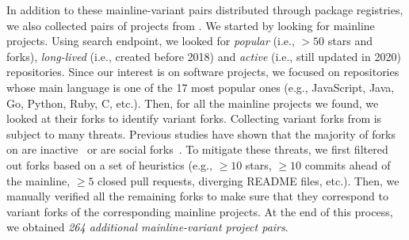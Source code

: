 In addition to these mainline-variant pairs distributed through package registries, we also collected pairs of projects from \gh.
We started by looking for mainline projects.
Using \gh search endpoint, we looked for \emph{popular} (i.e., $>50$ stars and forks), \emph{long-lived} (i.e., created before 2018) and \emph{active} (i.e., still updated in 2020) repositories. Since our interest is on software projects, we focused on repositories whose main language is one of the 17 most popular ones (e.g., \textsf{JavaScript, Java, Go, Python, Ruby, C}, etc.). 
Then, for all the mainline projects we found, we looked at their forks to identify variant forks. Collecting variant forks from \gh is subject to many threats. Previous studies have shown that the majority of forks on \gh are inactive~\cite{Businge:Android:2019,Businge:2017} or are social forks~\cite{businge:2018icsme}.
To mitigate these threats, we first filtered out forks based on a set of heuristics (e.g., $\geq 10$ stars, $\geq 10$ commits ahead of the mainline, $\geq 5$ closed pull requests, diverging \textsf{README} files, etc.).
Then, we manually verified all the remaining forks to make sure that they correspond to variant forks of the corresponding mainline projects.
At the end of this process, we obtained \textit{264 additional mainline-variant project pairs}.

